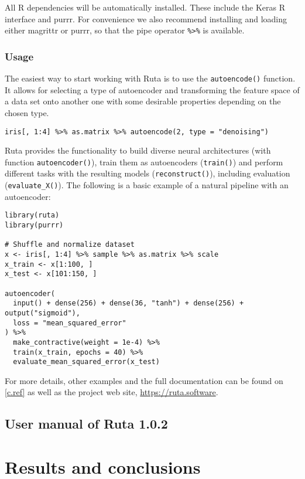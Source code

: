 \documentclass[oneside,openright,titlepage,numbers=noenddot,openany,headinclude,footinclude=true,
cleardoublepage=empty,abstractoff,BCOR=5mm,paper=a4,fontsize=12pt,main=spanish]{scrreprt}
\begin{document}
All R dependencies will be automatically installed. These include the Keras R interface and purrr. For convenience we also recommend installing and loading either magrittr or purrr, so that the pipe operator \texttt{\%>\%} is available.

\section{Usage}

The easiest way to start working with Ruta is to use the \texttt{autoencode()} function. It allows for selecting a type of autoencoder and transforming the feature space of a data set onto another one with some desirable properties depending on the chosen type.
\begin{verbatim}
iris[, 1:4] %>% as.matrix %>% autoencode(2, type = "denoising")  
\end{verbatim}

Ruta provides the functionality to build diverse neural architectures (with function \texttt{autoencoder()}), train them as autoencoders (\texttt{train()}) and perform different tasks with the resulting models (\texttt{reconstruct()}), including evaluation (\texttt{evaluate\_X()}). The following is a basic example of a natural pipeline with an autoencoder:
\begin{verbatim}
library(ruta)
library(purrr)

# Shuffle and normalize dataset
x <- iris[, 1:4] %>% sample %>% as.matrix %>% scale
x_train <- x[1:100, ]
x_test <- x[101:150, ]

autoencoder(
  input() + dense(256) + dense(36, "tanh") + dense(256) + output("sigmoid"),
  loss = "mean_squared_error"
) %>%
  make_contractive(weight = 1e-4) %>%
  train(x_train, epochs = 40) %>%
  evaluate_mean_squared_error(x_test)
\end{verbatim}

For more details, other examples and the full documentation can be found on \autoref{c.ref} as well as the project web site, \url{https://ruta.software}.

\chapter{User manual of Ruta 1.0.2}
\label{c.ref}



\part{Results and conclusions}
\end{document}
